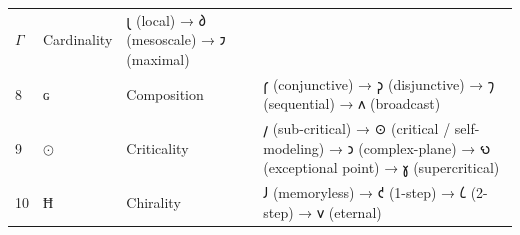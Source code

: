\begin{longtable}[]{@{}llll@{}}
\begin{minipage}[t]{0.24\columnwidth}
\(Γ\)\strut
\end{minipage} & \begin{minipage}[t]{0.13\columnwidth}\raggedright
Cardinality\strut
\end{minipage} & \begin{minipage}[t]{0.44\columnwidth}\raggedright
𐑚 (local) → 𐑔 (mesoscale) → 𐑲 (maximal)\strut
\end{minipage}\tabularnewline
\begin{minipage}[t]{0.07\columnwidth}\raggedright
8\strut
\end{minipage} & \begin{minipage}[t]{0.24\columnwidth}\raggedright
\(ɢ\)\strut
\end{minipage} & \begin{minipage}[t]{0.13\columnwidth}\raggedright
Composition\strut
\end{minipage} & \begin{minipage}[t]{0.44\columnwidth}\raggedright
𐑝 (conjunctive) → 𐑜 (disjunctive) → 𐑠 (sequential) → 𐑵 (broadcast)\strut
\end{minipage}\tabularnewline
\begin{minipage}[t]{0.07\columnwidth}\raggedright
9\strut
\end{minipage} & \begin{minipage}[t]{0.24\columnwidth}\raggedright
\(⊙\)\strut
\end{minipage} & \begin{minipage}[t]{0.13\columnwidth}\raggedright
Criticality\strut
\end{minipage} & \begin{minipage}[t]{0.44\columnwidth}\raggedright
𐑢 (sub-critical) → ⊙ (critical / self-modeling) → 𐑮 (complex-plane) → 𐑻
(exceptional point) → 𐑣 (supercritical)\strut
\end{minipage}\tabularnewline
\begin{minipage}[t]{0.07\columnwidth}\raggedright
10\strut
\end{minipage} & \begin{minipage}[t]{0.24\columnwidth}\raggedright
\(Ħ\)\strut
\end{minipage} & \begin{minipage}[t]{0.13\columnwidth}\raggedright
Chirality\strut
\end{minipage} & \begin{minipage}[t]{0.44\columnwidth}\raggedright
𐑓 (memoryless) → 𐑒 (1-step) → 𐑖 (2-step) → 𐑫 (eternal)\strut
\end{minipage}\tabularnewline

\end{longtable}
